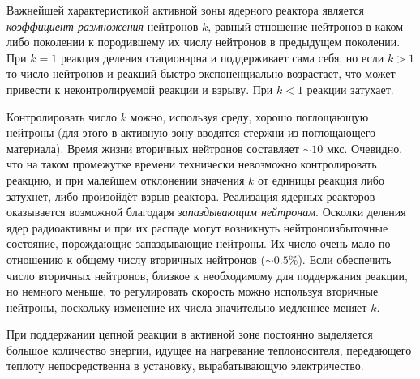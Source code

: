 \noindent
Важнейшей характеристикой активной зоны ядерного реактора является \textit{коэффициент размножения} нейтронов $k$, равный отношение нейтронов в каком-либо поколении к породившему их числу нейтронов в предыдущем поколении. При $k = 1$ реакция деления стационарна и поддерживает сама себя, но если $k > 1$ то число нейтронов и реакций быстро экспоненциально возрастает, что может привести к неконтролируемой реакции и взрыву. При $k < 1$ реакции затухает.

Контролировать число $k$ можно, используя среду, хорошо поглощающую нейтроны (для этого в активную зону вводятся стержни из поглощающего материала). Время жизни вторичных нейтронов составляет $\sim 10$ мкс. Очевидно, что на таком промежутке времени технически невозможно контролировать реакцию, и при малейшем отклонении значения $k$ от единицы реакция либо затухнет, либо произойдёт взрыв реактора. Реализация ядерных реакторов оказывается возможной благодаря \textit{запаздывающим нейтронам}. Осколки деления ядер радиоактивны и при их распаде могут возникнуть нейтроноизбыточные состояние, порождающие запаздывающие нейтроны. Их число очень мало по отношению к общему числу вторичных нейтронов ($\sim 0.5 \%$). Если обеспечить число вторичных нейтронов, близкое к необходимому для поддержания реакции, но немного меньше, то регулировать скорость можно используя вторичные нейтроны, поскольку изменение их числа значительно медленнее меняет $k$.

При поддержании цепной реакции в активной зоне постоянно выделяется большое количество энергии, идущее на нагревание теплоносителя, передающего теплоту непосредственна в установку, вырабатывающую электричество.